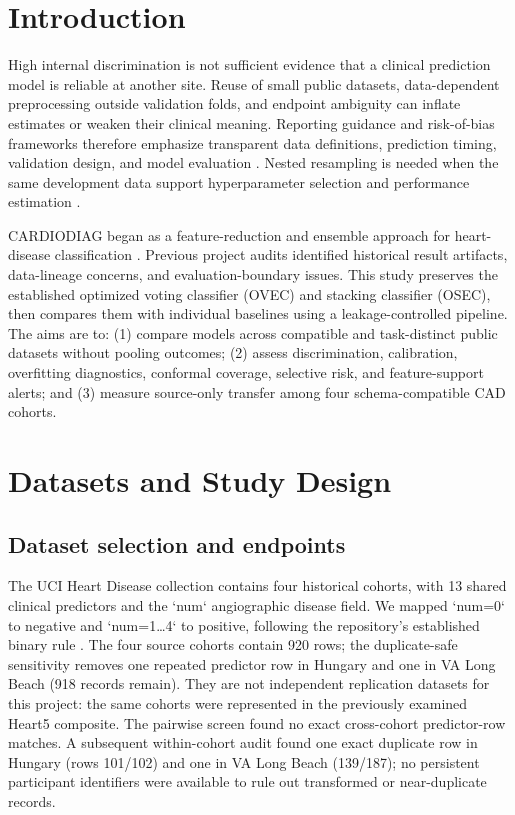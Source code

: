 \documentclass[conference]{IEEEtran}
\begin{document}
\section{Introduction}
High internal discrimination is not sufficient evidence that a clinical prediction model is reliable at another site. Reuse of small public datasets, data-dependent preprocessing outside validation folds, and endpoint ambiguity can inflate estimates or weaken their clinical meaning. Reporting guidance and risk-of-bias frameworks therefore emphasize transparent data definitions, prediction timing, validation design, and model evaluation \cite{collins2024tripodai,moons2025probastai}. Nested resampling is needed when the same development data support hyperparameter selection and performance estimation \cite{varma2006bias,cawley2010overfitting}.

CARDIODIAG began as a feature-reduction and ensemble approach for heart-disease classification \cite{khan2026cardiodiag}. Previous project audits identified historical result artifacts, data-lineage concerns, and evaluation-boundary issues. This study preserves the established optimized voting classifier (OVEC) and stacking classifier (OSEC), then compares them with individual baselines using a leakage-controlled pipeline. The aims are to: (1) compare models across compatible and task-distinct public datasets without pooling outcomes; (2) assess discrimination, calibration, overfitting diagnostics, conformal coverage, selective risk, and feature-support alerts; and (3) measure source-only transfer among four schema-compatible CAD cohorts.

\section{Datasets and Study Design}
\subsection{Dataset selection and endpoints}
The UCI Heart Disease collection contains four historical cohorts, with 13 shared clinical predictors and the `num` angiographic disease field. We mapped `num=0` to negative and `num=1\ldots4` to positive, following the repository’s established binary rule \cite{ucihd}. The four source cohorts contain 920 rows; the duplicate-safe sensitivity removes one repeated predictor row in Hungary and one in VA Long Beach (918 records remain). They are not independent replication datasets for this project: the same cohorts were represented in the previously examined Heart5 composite. The pairwise screen found no exact cross-cohort predictor-row matches. A subsequent within-cohort audit found one exact duplicate row in Hungary (rows 101/102) and one in VA Long Beach (139/187); no persistent participant identifiers were available to rule out transformed or near-duplicate records.
\end{document}
